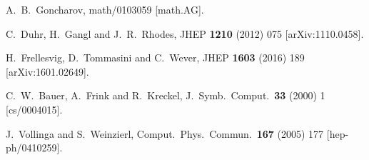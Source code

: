 \documentclass[12pt]{article}
\begin{document}
\begin{thebibliography}{99}
  A.~B.~Goncharov,
  math/0103059 [math.AG].
  
  C.~Duhr, H.~Gangl and J.~R.~Rhodes,
  JHEP {\bf 1210} (2012) 075
   [arXiv:1110.0458].
  
  H.~Frellesvig, D.~Tommasini and C.~Wever,
  JHEP {\bf 1603} (2016) 189
  [arXiv:1601.02649].
  
  C.~W.~Bauer, A.~Frink and R.~Kreckel,
  J.\ Symb.\ Comput.\  {\bf 33} (2000) 1
  [cs/0004015].

  J.~Vollinga and S.~Weinzierl,
  Comput.\ Phys.\ Commun.\  {\bf 167} (2005) 177
  [hep-ph/0410259].


\end{thebibliography}
\end{document}

